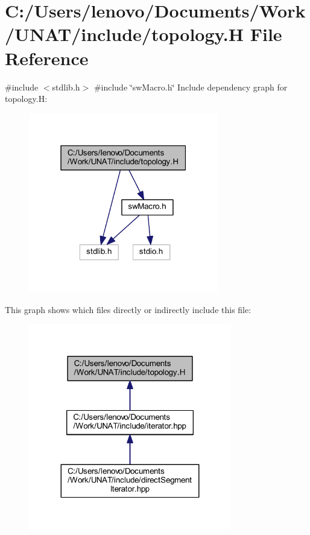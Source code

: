 \hypertarget{include_2topology_8H}{}\section{C\+:/\+Users/lenovo/\+Documents/\+Work/\+U\+N\+A\+T/include/topology.H File Reference}
\label{include_2topology_8H}
{\ttfamily \#include $<$stdlib.\+h$>$}\newline
{\ttfamily \#include \char`\"{}sw\+Macro.\+h\char`\"{}}\newline
Include dependency graph for topology.\+H\+:
\nopagebreak
\begin{figure}[H]
\begin{center}
\leavevmode
\includegraphics[width=235pt]{include_2topology_8H__incl}
\end{center}
\end{figure}
This graph shows which files directly or indirectly include this file\+:
\nopagebreak
\begin{figure}[H]
\begin{center}
\leavevmode
\includegraphics[width=251pt]{include_2topology_8H__dep__incl}
\end{center}
\end{figure}
